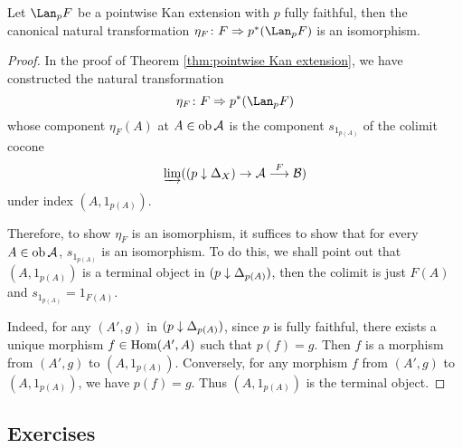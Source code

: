   \begin{prop}
    Let $\Lan_pF$ be a pointwise Kan extension with $p$ fully faithful, then the canonical natural transformation $\eta_F\colon F\then p^{\ast}(\Lan_pF)$ is an isomorphism.
  \end{prop}
  \begin{proof}
    In the proof of Theorem \ref{thm:pointwise Kan extension}, we have constructed the natural transformation
    \begin{equation*}
      \eta_F\colon F\then p^{\ast}(\Lan_pF)
    \end{equation*}
    whose component $\eta_F(A)$ at $A\in\operatorname{ob}{\cal A}$ is the component $s_{1_{p(A)}}$ of the colimit cocone
    \begin{equation*}
      \operatorname*{\underrightarrow{\lim}}((p\downarrow\Delta_X)\to{\cal A}\stackrel{{F}}{\longrightarrow}{\cal B})
    \end{equation*}
    under index $(A,1_{p(A)})$.

    Therefore, to show $\eta_F$ is an isomorphism, it suffices to show that for every $A\in\operatorname{ob}{\cal A}$, $s_{1_{p(A)}}$ is an isomorphism. To do this, we shall point out that $(A,1_{p(A)})$ is a terminal object in $(p\downarrow\Delta_{p(A)})$, then the colimit is just $F(A)$ and $s_{1_{p(A)}}=1_{F(A)}$.

    Indeed, for any $(A',g)$ in $(p\downarrow\Delta_{p(A)})$, since $p$ is fully faithful, there exists a unique morphism $f\in\operatorname{Hom}(A',A)$ such that $p(f)=g$. Then $f$ is a morphism from $(A',g)$ to $(A,1_{p(A)})$. Conversely, for any morphism $f$ from $(A',g)$ to $(A,1_{p(A)})$, we have $p(f)=g$. Thus $(A,1_{p(A)})$ is the terminal object.
  \end{proof}

\subsection{Exercises}

